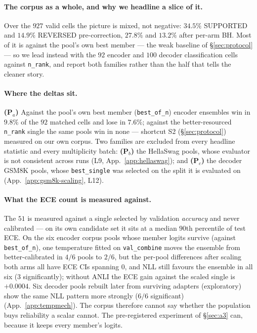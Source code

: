 \documentclass[11pt]{article}
\begin{document}
\paragraph{The corpus as a whole, and why we headline a slice of it.} Over the $927$ valid cells the picture is mixed, not negative: $34.5\%$ SUPPORTED and $14.9\%$ REVERSED pre-correction, $27.8\%$ and $13.2\%$ after per-arm BH. Most of it is against the pool's own best member --- the weak baseline of \S\ref{sec:protocol} --- so we lead instead with the $92$ encoder and $100$ decoder classification cells against \texttt{n\_rank}, and report both families rather than the half that tells the cleaner story.

\paragraph{Where the deltas sit.} \textbf{(P$_a$)} Against the pool's own best member (\texttt{best\_of\_n}) encoder ensembles win in $9.8\%$ of the $92$ matched cells and lose in $7.6\%$; against the better-resourced \texttt{n\_rank} single the same pools win in none --- shortcut S2 (\S\ref{sec:protocol}) measured on our own corpus. Two families are excluded from every headline statistic and every multiplicity batch: \textbf{(P$_b$)} the HellaSwag pools, whose evaluator is not consistent across runs (L9, App.~\ref{app:hellaswag}); and \textbf{(P$_c$)} the decoder GSM8K pools, whose \texttt{best\_single} was selected on the split it is evaluated on (App.~\ref{app:gsm8k-scaling}, L12).

\paragraph{What the ECE count is measured against.} The $51$ is measured against a single selected by validation \emph{accuracy} and never calibrated --- on its own candidate set it sits at a median $90$th percentile of test ECE. On the six encoder corpus pools whose member logits survive (against \texttt{best\_of\_n}), one temperature fitted on \texttt{val\_combine} moves the ensemble from better-calibrated in $4/6$ pools to $2/6$, but the per-pool differences after scaling both arms all have ECE CIs spanning $0$, and NLL still favours the ensemble in all six ($3$ significantly); without ANLI the ECE gain against the scaled single is ${+}0.0004$. Six decoder pools rebuilt later from surviving adapters (exploratory) show the same NLL pattern more strongly ($6/6$ significant) (App.~\ref{app:tempmech}). The corpus therefore cannot say whether the population buys reliability a scalar cannot. The pre-registered experiment of \S\ref{sec:a3} can, because it keeps every member's logits.
\end{document}
